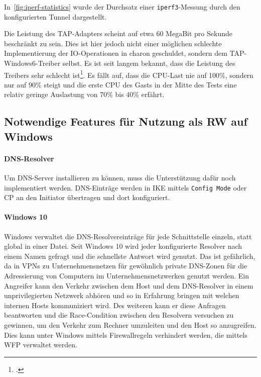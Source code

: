 {\begin{figure}[h!]
\label{fig:iperf-statistics}
\end{figure}

In~\autoref{fig:iperf-statistics} wurde der Durchsatz einer \texttt{iperf3}-Messung
durch den konfigurierten Tunnel dargestellt.

Die Leistung des TAP-Adapters scheint auf etwa 60 MegaBit pro Sekunde beschränkt zu sein.
Dies ist hier jedoch nicht einer möglichen schlechte Implementierung der IO-Operationen in charon
geschuldet, sondern dem TAP-Windows6-Treiber selbst. Es ist seit langem bekannt, dass die
Leistung des Treibers sehr schlecht ist\footcite[][]{_openvpn_2015}.
Es fällt auf, dass die \ac{CPU}-Last nie auf 100\%, sondern nur auf 90\%
steigt und die erste CPU des Gasts in der Mitte des Tests eine relativ geringe Auslastung von
70\% bis 40\% erfährt.

\subsection{Notwendige Features für Nutzung als RW auf Windows}

\paragraph{DNS-Resolver}
Um DNS-Server installieren zu können, muss die Unterstützung dafür noch implementiert werden.
DNS-Einträge werden in IKE mittels \texttt{Config Mode} oder \ac{CP} an den Initiator übertragen
und dort konfiguriert.
\paragraph{Windows 10}
Windows verwaltet die DNS-Resolvereinträge für jede Schnittstelle einzeln, statt
global in einer Datei. Seit Windows 10 wird jeder konfigurierte Resolver nach einem Namen
gefragt und die schnellste Antwort wird genutzt. Das ist gefährlich, da in VPNs 
zu Unternehmensnetzen für gewöhnlich private DNS-Zonen für die Adressierung
von Computern im Unternehmensnetzwerken genutzt werden. Ein Angreifer kann
den Verkehr zwischen dem Host und dem DNS-Resolver in einem unprivilegierten
Netzwerk abhören und so in Erfahrung bringen mit welchen internen Hosts kommuniziert wird.
Des weiteren kann er diese Anfragen beantworten und die Race-Condition zwischen den
Resolvern versuchen zu gewinnen, um den Verkehr zum Rechner umzuleiten und
den Host so anzugreifen. Dies kann unter Windows mittels Firewallregeln
verhindert werden, die mittels \ac{WFP} verwaltet werden.

}
